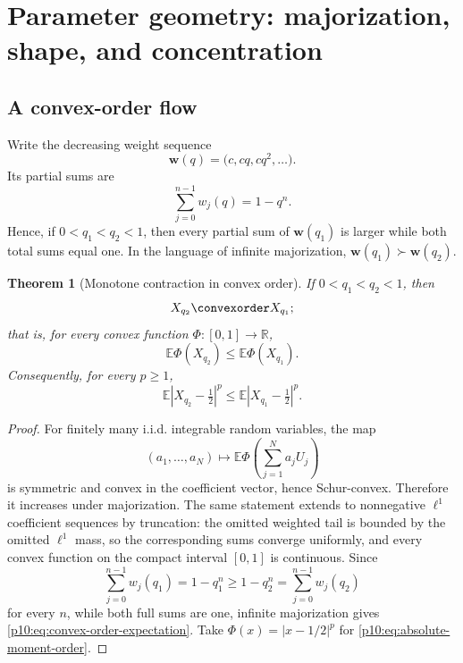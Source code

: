 \documentclass[11pt]{article}
\numberwithin{equation}{section}
\newtheorem{theorem}{Theorem}[section]
\theoremstyle{definition}
\theoremstyle{remark}
\newcommand{\R}{\mathbb R}
\newcommand{\E}{\mathbb E}
\begin{document}
\section{Parameter geometry: majorization, shape, and concentration}
\label{p10:sec:geometry}

\subsection{A convex-order flow}

Write the decreasing weight sequence
\[
 \bm w(q)=\bigl(c,cq,cq^2,\ldots\bigr).
\]
Its partial sums are
\[
 \sum_{j=0}^{n-1}w_j(q)=1-q^n.
\]
Hence, if $0<q_1<q_2<1$, then every partial sum of $\bm w(q_1)$ is larger while both total
sums equal one.  In the language of infinite majorization,
\(
 \bm w(q_1)\succ\bm w(q_2).
\)

\begin{theorem}[Monotone contraction in convex order]
\label{p10:thm:convex-order}
If $0<q_1<q_2<1$, then
\begin{equation}
 X_{q_2}\convexorder X_{q_1};                               \label{p10:eq:convex-order}
\end{equation}
that is, for every convex function $\Phi:[0,1]\to\R$,
\begin{equation}
 \E\Phi(X_{q_2})\le\E\Phi(X_{q_1}).                         \label{p10:eq:convex-order-expectation}
\end{equation}
Consequently, for every $p\ge1$,
\begin{equation}
 \E|X_{q_2}-\tfrac12|^p
 \le \E|X_{q_1}-\tfrac12|^p.                               \label{p10:eq:absolute-moment-order}
\end{equation}
\end{theorem}

\begin{proof}
For finitely many i.i.d. integrable random variables, the map
\[
 (a_1,\ldots,a_N)\longmapsto
 \E\Phi\!\left(\sum_{j=1}^Na_jU_j\right)
\]
is symmetric and convex in the coefficient vector, hence Schur-convex.  Therefore it
increases under majorization.  The same statement extends to nonnegative $\ell^1$ coefficient
sequences by truncation: the omitted weighted tail is bounded by the omitted $\ell^1$ mass,
so the corresponding sums converge uniformly, and every convex function on the compact
interval $[0,1]$ is continuous.  Since
\[
 \sum_{j=0}^{n-1}w_j(q_1)=1-q_1^n\ge1-q_2^n
 =\sum_{j=0}^{n-1}w_j(q_2)
\]
for every $n$, while both full sums are one, infinite majorization gives
\eqref{p10:eq:convex-order-expectation}.  Take
$\Phi(x)=|x-1/2|^p$ for \eqref{p10:eq:absolute-moment-order}.
\end{proof}
\end{document}
